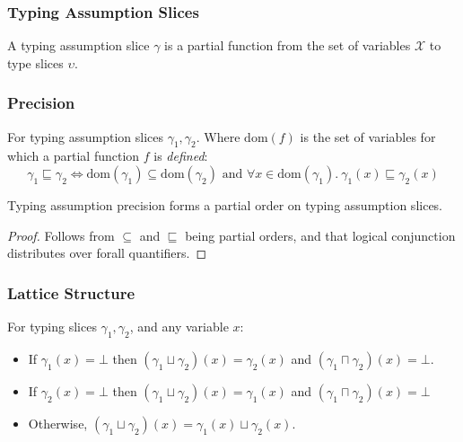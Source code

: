 \subsubsection{Typing Assumption Slices}
\begin{definition}
A typing assumption slice $\gamma$ is a partial function from the set of variables $\mathcal{X}$ to type slices $\upsilon$.
\end{definition}
\subsubsection{Precision}
\begin{definition}
For typing assumption slices $\gamma_1, \gamma_2$. Where $\mathrm{dom}(f)$ is the set of variables for which a partial function $f$ is \textit{defined}:
\[\gamma_1 \sqsubseteq \gamma_2 \iff \mathrm{dom}(\gamma_1) \subseteq \mathrm{dom}(\gamma_2) \text{ and } \forall x \in  \mathrm{dom}(\gamma_1).\ \gamma_1(x) \sqsubseteq \gamma_2(x)\]
\end{definition}
\begin{proposition}
Typing assumption precision forms a partial order on typing assumption slices.
\end{proposition}
\begin{proof}
Follows from $\subseteq$ and $\sqsubseteq$ being partial orders, and that logical conjunction distributes over forall quantifiers.
\end{proof}
\subsubsection{Lattice Structure}
\begin{definition}
For typing slices $\gamma_1, \gamma_2$, and any variable $x$:
\begin{itemize}
\item If $\gamma_1(x) = \bot$ then $(\gamma_1 \sqcup \gamma_2)(x) = \gamma_2(x)$ and $(\gamma_1 \sqcap \gamma_2)(x) = \bot$. 
\item If $\gamma_2(x) = \bot$ then $(\gamma_1 \sqcup \gamma_2)(x) = \gamma_1(x)$ and $(\gamma_1 \sqcap \gamma_2)(x) = \bot$
\item Otherwise, $(\gamma_1 \sqcup \gamma_2)(x) = \gamma_1(x) \sqcup \gamma_2(x)$.
\end{itemize}
\end{definition}

